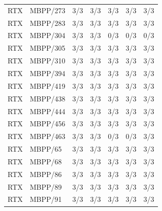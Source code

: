 \begin{longtable}{@{}llrrrrr@{}}
RTX & MBPP/273 & 3/3 & 3/3 & 3/3 & 3/3 & 3/3 \\
RTX & MBPP/283 & 3/3 & 3/3 & 3/3 & 3/3 & 3/3 \\
RTX & MBPP/304 & 3/3 & 3/3 & 0/3 & 0/3 & 0/3 \\
RTX & MBPP/305 & 3/3 & 3/3 & 3/3 & 3/3 & 3/3 \\
RTX & MBPP/310 & 3/3 & 3/3 & 3/3 & 3/3 & 3/3 \\
RTX & MBPP/394 & 3/3 & 3/3 & 3/3 & 3/3 & 3/3 \\
RTX & MBPP/419 & 3/3 & 3/3 & 3/3 & 3/3 & 3/3 \\
RTX & MBPP/438 & 3/3 & 3/3 & 3/3 & 3/3 & 3/3 \\
RTX & MBPP/444 & 3/3 & 3/3 & 3/3 & 3/3 & 3/3 \\
RTX & MBPP/456 & 3/3 & 3/3 & 3/3 & 3/3 & 3/3 \\
RTX & MBPP/463 & 3/3 & 3/3 & 0/3 & 0/3 & 3/3 \\
RTX & MBPP/65 & 3/3 & 3/3 & 3/3 & 3/3 & 3/3 \\
RTX & MBPP/68 & 3/3 & 3/3 & 3/3 & 3/3 & 3/3 \\
RTX & MBPP/86 & 3/3 & 3/3 & 3/3 & 3/3 & 3/3 \\
RTX & MBPP/89 & 3/3 & 3/3 & 3/3 & 3/3 & 3/3 \\
RTX & MBPP/91 & 3/3 & 3/3 & 3/3 & 3/3 & 3/3 \\
\bottomrule\end{longtable}

